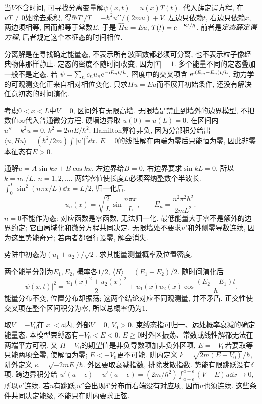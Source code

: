 当$V$不含时间, 可寻找分离变量解$\psi(x,t)=u(x)T(t)$. 代入薛定谔方程, 在$uT\neq0$处除去乘积, 得$\ii\hbar T\prime/T=-\hbar^2u\prime\prime/(2mu)+V$. 左边只依赖$t$, 右边只依赖$x$, 两边须相等, 因而都等于常数$E$. 于是 $\hat Hu=Eu$, $T(t)=\mathrm e^{-\mathrm i Et/\hbar}$. 前者是\emph{定态薛定谔方程}, 后者规定这个本征态的时间相位.

分离解是在寻找确定能量态, 不表示所有波函数都必须可分离, 也不表示粒子像经典物体那样静止. 定态的密度不随时间改变, 因为$|T|=1$. 多个能量不同的定态叠加一般不是定态. 若 $\psi=\sum_n c_nu_n\mathrm e^{-\mathrm i E_nt/\hbar}$, 密度中的交叉项含 $\mathrm e^{\mathrm i(E_m-E_n)t/\hbar}$. 动力学的可观测变化正来自相对相位变化. 只求$Hu=Eu$而不展开初始条件, 还没有解决任意初态的时间演化.

考虑$0<x<L$中$V=0$, 区间外有无限高墙. 无限墙是禁止到墙外的边界模型, 不把数值$\infty$代入普通微分方程. 硬墙边界取 $u(0)=u(L)=0$. 在区间内 $u''+k^2u=0$, $k^2=2mE/\hbar^2$. Hamilton算符非负, 因为分部积分给出 $\langle u,Hu\rangle=(\hbar^2/2m)\int|u'|^2\dd x$. $E=0$的线性解在两端为零后只能恒为零, 因此非零本征态有$E>0$.

通解$u=A\sin kx+B\cos kx$. 左边界给$B=0$, 右边界要求$\sin kL=0$, 所以$k=n\pi/L$, $n=1,2,\ldots$. 两端零值使长度$L$必须容纳整数个半波长. $\int_0^L\sin^2(n\pi x/L)\dd x=L/2$, 归一化后,
\[
u_n(x)=\sqrt{\frac2L}\sin\frac{n\pi x}{L},
\qquad E_n=\frac{n^2\pi^2\hbar^2}{2mL^2}.
\]
$n=0$不能作为态: 对应函数是零函数, 无法归一化. 最低能量大于零不是额外的边界约定; 它由局域化和微分方程共同决定. 无限墙处不要求$u'$和外侧零导数连续, 因为这里势能奇异; 若两者都强行设零, 解会消失.

\begin{example}
势阱中初态为$(u_1+u_2)/\sqrt2$. 求其能量测量概率及位置密度.
\end{example}
\begin{solution}
两个能量分别为$E_1,E_2$, 概率各$1/2$, $\langle H\rangle=(E_1+E_2)/2$. 随时间演化后
\[
|\psi(x,t)|^2=\frac{u_1(x)^2+u_2(x)^2}{2}
+u_1(x)u_2(x)\cos\frac{(E_2-E_1)t}{\hbar}.
\]
能量分布不变, 位置分布却振荡; 这两个结论对应不同观测量, 并不矛盾. 正交性使交叉项在整个区间积分为零, 所以总概率仍为1.
\end{solution}

取$V=-V_0$在$|x|<a$内, 外部$V=0$, $V_0>0$. 束缚态指可归一、远处概率衰减的确定能量态. 本模型束缚态有$-V_0<E<0$. $E\ge0$时外区振荡、常数或线性解都无法在两端平方可积. 又 $H+V_0$的期望值是非负导数项加非负外区项, $E=-V_0$若要取等只能两项全零, 使解恒为零; $E<-V_0$更不可能. 阱内定义 $k=\sqrt{2m(E+V_0)}/\hbar$, 阱外定义 $\kappa=\sqrt{-2mE}/\hbar$. 外区要取衰减指数, 排除发散指数. 势能有限跳跃没有$\delta$项. 跨边界积分给 $u'(a+\epsilon)-u'(a-\epsilon)=(2m/\hbar^2)\int_{a-\epsilon}^{a+\epsilon}(V-E)u\dd x\to0$, 所以$u'$连续. 若$u$有跳跃,$u''$会出现$\delta'$分布而右端没有对应项, 因而$u$也须连续. 这些条件共同决定能级, 不能只在阱内要求正弦.

